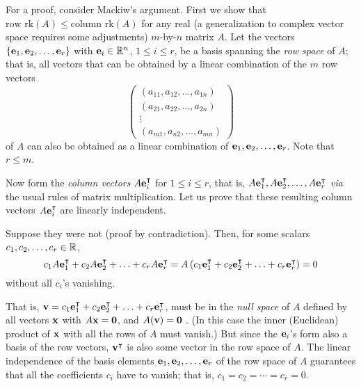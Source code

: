{\color{OliveGreen}
\bproof

For a proof,  consider Mackiw's argument.\cite{Mackiw-1995}
First we show that $\textrm{row rk} (A)\le \textrm{column rk} (A)$ for any real
(a generalization to complex vector space requires some adjustments)
$m$-by-$n$ matrix $A$. Let the vectors
$\{{\bf e}_1,{\bf e}_2, \ldots ,{\bf e}_r\}$ with ${\bf e}_i \in {\Bbb R}^n$, $1\le i\le r$,
be a basis spanning the
{\em row space} of
 $A$; that is, all vectors
that can be obtained by a linear combination of the $m$ row vectors
$$
\begin{pmatrix}
(a_{11},a_{12},\ldots ,a_{1n})\\
(a_{21},a_{22},\ldots ,a_{2n})\\
\vdots                    \\
(a_{m1},a_{n2},\ldots ,a_{mn})
\end{pmatrix}
$$
of $A$ can also be obtained as a linear combination of ${\bf e}_1,{\bf e}_2, \ldots ,{\bf e}_r$.
Note that $r\le m$.

Now form the {\em column vectors} $A{\bf e}_i^\intercal $ for $1\le i\le r$, that is,
$A{\bf e}_1^\intercal ,A{\bf e}_2^\intercal , \ldots ,A{\bf e}_r^\intercal $ {\em via} the usual rules of matrix multiplication.
Let us prove that these resulting column vectors $A{\bf e}_i^\intercal $ are linearly independent.

Suppose they were not (proof by contradiction).
Then, for some scalars
$c_1,c_2, \ldots ,c_r \in {\Bbb R}$,
$$
c_1 A{\bf e}_1^\intercal + c_2 A{\bf e}_2^\intercal + \ldots + c_r A{\bf e}_r^\intercal
=
 A\left(c_1{\bf e}_1^\intercal + c_2  {\bf e}_2^\intercal + \ldots + c_r  {\bf e}_r^\intercal  \right)=0
$$
without all $c_i$'s vanishing.

That is,
$
{\bf v} =
c_1{\bf e}_1^\intercal + c_2  {\bf e}_2^\intercal + \ldots + c_r  {\bf e}_r^\intercal
$, must be in the {\em null space}
of $A$ defined by all vectors ${\bf x}$ with $A{\bf x}={\bf 0}$,
and $A({\bf v})={\bf 0}$ .
(In this case the inner (Euclidean) product of ${\bf x}$ with all the rows of $A$ must vanish.)
But since the ${\bf e}_i$'s form also a basis of the row vectors,
$
{\bf v}^\intercal
$
is also some vector in the row space of $A$.
The linear independence of the basis elements
${\bf e}_1,{\bf e}_2, \ldots ,{\bf e}_r$   of the row  space of $A$
guarantees that
all the coefficients $c_i$ have to vanish; that is,
$c_1=c_2= \cdots =c_r =0$.

}
